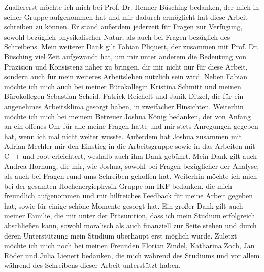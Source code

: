 Zuallererst möchte ich mich bei Prof. Dr. Henner Büsching bedanken, der mich in seiner Gruppe aufgenommen hat und mir dadurch ermöglicht hat diese Arbeit schreiben zu können.
Er stand außerdem jederzeit für Fragen zur Verfügung, sowohl bezüglich physikalischer Natur, als auch bei Fragen bezüglich des Schreibens.
\newline
Mein weiterer Dank gilt Fabian Pliquett, der zusammen mit Prof. Dr. Büsching viel Zeit aufgewandt hat, um mir unter anderem die Bedeutung von Präzision und Konsistenz näher zu bringen, dir mir nicht nur für diese Arbeit, sondern auch für mein weiteres Arbeitsleben nützlich sein wird.
\newline
Neben Fabian möchte ich mich auch bei meiner Bürokollegin Kristina Schmitt und meinen Büro\-kol\-le\-gen Sebastian Scheid, Patrick Reichelt und Janik Ditzel, die für ein angenehmes Arbeitsklima gesorgt haben, in zweifacher Hinsichten.
\newline
Weiterhin möchte ich mich bei meinem Betreuer Joshua König bedanken, der von Anfang an ein offenes Ohr für alle meine Fragen hatte und mir stets Anregungen gegeben hat, wenn ich mal nicht weiter wusste.
\newline
Außerdem hat Joshua zusammen mit Adrian Mechler mir den Einstieg in die Arbeitsgruppe sowie in das Arbeiten mit C++ und root erleichtert, weshalb auch ihm Dank gebührt.
\newline
Mein Dank gilt auch Andrea Hornung, die mir, wie Joshua, sowohl bei Fragen bezüglicher der Analyse, als auch bei Fragen rund ums Schreiben geholfen hat.
\newline
Weiterhin möchte ich mich bei der gesamten Hochenergiephysik-Gruppe am IKF bedanken, die mich freundlich aufgenommen und mir hilfreiches Feedback für meine Arbeit gegeben hat, sowie für einige schöne Momente gesorgt hat.
\newline 
Ein großer Dank gilt auch meiner Familie, die mir unter der Präsumtion, dass ich mein Studium erfolgreich abschließen kann, sowohl moralisch als auch finanziell zur Seite stehen und durch deren Unterstützung mein Studium überhaupt erst möglich wurde.
\newline
Zuletzt möchte ich mich noch bei meinen Freunden Florian Zindel, Katharina Zoch, Jan Röder und Julia Lienert bedanken, die mich während des Studiums und vor allem während des Schreibens dieser Arbeit unterstützt haben.